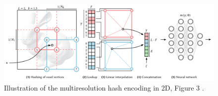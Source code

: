 \begin{figure}[h]
    \centering
    \includegraphics[width=1.0\textwidth]{figures/instant-ngp-hash-encoding.png}
    \caption{Illustration of the multiresolution hash encoding in 2D, Figure 3 \cite{muller_instant_2022}.}
    \label{fig:instant-ngp-hash-encoding}
\end{figure}